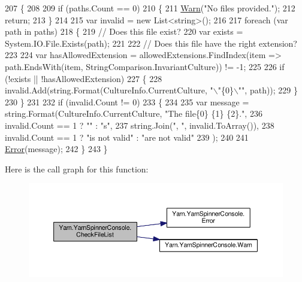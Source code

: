 \begin{DoxyCode}
207         \{
208 
209             \textcolor{keywordflow}{if} (paths.Count == 0)
210             \{
211                 \hyperlink{a00197_a979bb6f049b6c5294f745a19e24ddd9d}{Warn}(\textcolor{stringliteral}{"No files provided."});
212                 \textcolor{keywordflow}{return};
213             \}
214 
215             var invalid = \textcolor{keyword}{new} List<string>();
216 
217             \textcolor{keywordflow}{foreach} (var path \textcolor{keywordflow}{in} paths)
218             \{
219                 \textcolor{comment}{// Does this file exist?}
220                 var exists = System.IO.File.Exists(path);
221 
222                 \textcolor{comment}{// Does this file have the right extension?}
223 
224                 var hasAllowedExtension = allowedExtensions.FindIndex(item => path.EndsWith(item, 
      StringComparison.InvariantCulture)) != -1;
225 
226                 \textcolor{keywordflow}{if} (!exists || !hasAllowedExtension)
227                 \{
228                     invalid.Add(string.Format(CultureInfo.CurrentCulture, \textcolor{stringliteral}{"\(\backslash\)"\{0\}\(\backslash\)""}, path));
229                 \}
230             \}
231 
232             \textcolor{keywordflow}{if} (invalid.Count != 0)
233             \{
234 
235                 var message = string.Format(CultureInfo.CurrentCulture, \textcolor{stringliteral}{"The file\{0\} \{1\} \{2\}."},
236                     invalid.Count == 1 ? \textcolor{stringliteral}{""} : \textcolor{stringliteral}{"s"},
237                                             string.Join(\textcolor{stringliteral}{", "}, invalid.ToArray()),
238                     invalid.Count == 1 ? \textcolor{stringliteral}{"is not valid"} : \textcolor{stringliteral}{"are not valid"}
239                 );
240 
241                 \hyperlink{a00197_a2f63f9f5b7634cb50ee75ff2eb18b137}{Error}(message);
242             \}
243         \}
\end{DoxyCode}


Here is the call graph for this function\-:
\nopagebreak
\begin{figure}[H]
\begin{center}
\leavevmode
\includegraphics[width=350pt]{a00197_ad77564b25725a771f0fd4da430582e6f_cgraph}
\end{center}
\end{figure}




